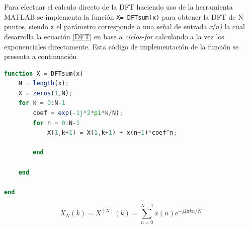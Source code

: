 Para efectuar el calculo directo de la DFT haciendo uso de la herramienta MATLAB se implementa la función \texttt{X= DFTsum(x)} para obtener la DFT de N puntos, siendo \texttt{x} el parámetro corresponde a una señal de entrada \textit{x(n)} la cual desarrolla la ecuación \ref{DFT} en base a \textit{ciclos-for} calculando a la vez los exponenciales directamente. Esta código de implementación de la función se presenta a continuación

\begin{lstlisting}[language = octave]
function X = DFTsum(x)
    N = length(x);
    X = zeros(1,N);
    for k = 0:N-1
        coef = exp(-1j*2*pi*k/N);
        for n = 0:N-1
            X(1,k+1) = X(1,k+1) + x(n+1)*coef^n;
          
        end
        
    end
    
end
\end{lstlisting}


\begin{equation}
    X_N(k) = X^{(N)}(k) = \sum_{n = 0}^{N-1} x(n)e^{-j2\pi k n /N}
    \label{DFT}
\end{equation}

